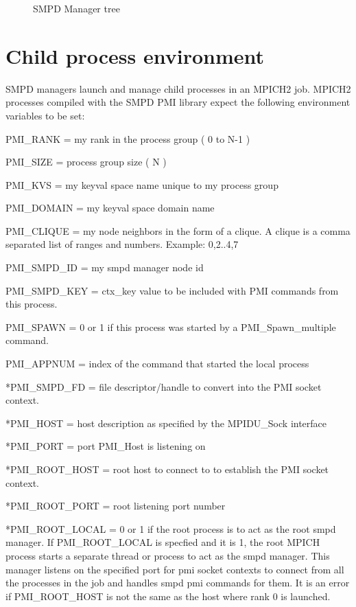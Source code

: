 \documentclass[dvipdfm,11pt]{article}
\begin{document}
\begin{figure}
\centerline{}
\caption{SMPD Manager tree}
\label{fig:tree}
\end{figure}

\section{Child process environment}
SMPD managers launch and manage child processes in an MPICH2 job.
MPICH2 processes compiled with the SMPD PMI library expect the following
environment variables to be set:

\begin{description}
\item PMI\_RANK = my rank in the process group ( 0 to N-1 )
\item PMI\_SIZE = process group size ( N )
\item PMI\_KVS = my keyval space name unique to my process group
\item PMI\_DOMAIN = my keyval space domain name
\item *PMI\_CLIQUE = my node neighbors in the form of a clique.  A clique is
a comma separated list of ranges and numbers.  Example: 0,2..4,7
\item PMI\_SMPD\_ID = my smpd manager node id
\item PMI\_SMPD\_KEY = ctx\_key value to be included with PMI commands 
from this process.
\item PMI\_SPAWN = 0 or 1 if this process was started by a 
PMI\_Spawn\_multiple command.
\item PMI\_APPNUM = index of the command that started the local process
\item **PMI\_SMPD\_FD = file descriptor/handle to convert into the PMI 
socket context.
\item **PMI\_HOST = host description as specified by the MPIDU\_Sock interface
\item **PMI\_PORT = port PMI\_Host is listening on
\item **PMI\_ROOT\_HOST = root host to connect to to establish the PMI 
socket context.
\item **PMI\_ROOT\_PORT = root listening port number
\item **PMI\_ROOT\_LOCAL = 0 or 1 if the root process is to act as the root smpd manager.
If PMI\_ROOT\_LOCAL is specfied and it is 1, the root MPICH process starts a separate
thread or process to act as the smpd manager.  This manager listens on the specified port
for pmi socket contexts to connect from all the processes in the job and handles smpd pmi
commands for them.  It is an error if PMI\_ROOT\_HOST is not the same as the host where
rank 0 is launched.
\end{description}
\end{document}
